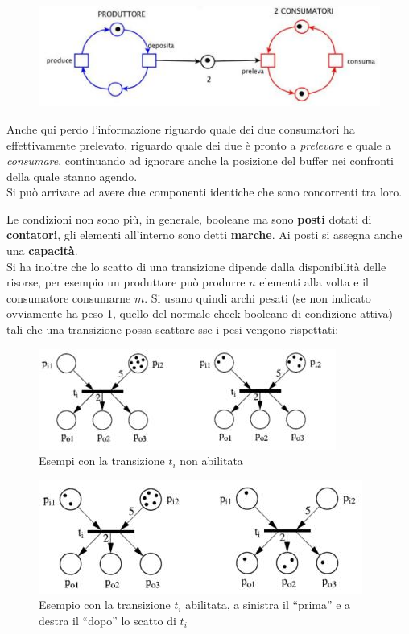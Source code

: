 \documentclass[a4paper,12pt, oneside]{book}
\begin{document}
\begin{esempio}
  \begin{figure}[H]
    \centering
    \includegraphics[scale = 0.7]{img/pt6.jpg} 
  \end{figure}
  Anche qui perdo l'informazione riguardo quale dei due consumatori ha
  effettivamente prelevato, riguardo quale dei due è pronto a \textit{prelevare}
  e quale a \textit{consumare}, continuando ad ignorare anche la posizione
  del buffer nei confronti della quale stanno agendo.\\
  Si può arrivare ad avere due componenti identiche che sono concorrenti tra
  loro. 
\end{esempio}
Le condizioni non sono più, in generale, booleane ma sono \textbf{posti}
dotati di \textbf{contatori}, gli elementi all'interno sono detti
\textbf{marche}. Ai posti si assegna anche una \textbf{capacità}. 
\\
Si ha inoltre che lo scatto di una transizione dipende dalla disponibilità
delle risorse, per esempio un produttore può produrre $n$ elementi alla volta
e il consumatore consumarne $m$. Si usano quindi archi pesati (se non indicato
ovviamente ha peso 1, quello del normale check booleano di condizione attiva)
tali che una transizione possa scattare sse i pesi vengono rispettati:
\begin{figure}[H]
  \centering
  \includegraphics[scale = 0.7]{img/pt7.jpg}
  \caption{Esempi con la transizione $t_i$ non abilitata}
\end{figure}
\begin{figure}[H]
  \centering
  \includegraphics[scale = 0.7]{img/pt8.jpg}
  \caption{Esempio con la transizione $t_i$ abilitata, a sinistra il ``prima''
    e a destra il ``dopo'' lo scatto di $t_i$}
\end{figure}
\end{document}
